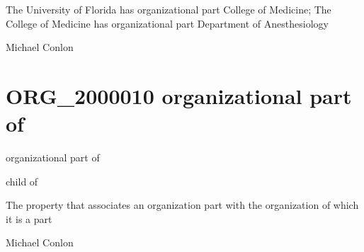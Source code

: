 \documentclass[letterpaper,10pt,english]{sphinxmanual}
\begin{document}
\begin{sphinxShadowBox}

\sphinxAtStartPar
The University of Florida has organizational part College of Medicine; The College of Medicine has organizational part Department of Anesthesiology
\end{sphinxShadowBox}

\begin{sphinxShadowBox}

\sphinxAtStartPar
Michael Conlon 
\end{sphinxShadowBox}
\begin{quote}
\label{\detokenize{doc-ORG_2000010:org-2000010}}\label{\detokenize{doc-ORG_2000010:organizational-part-of}}\label{\detokenize{doc-ORG_2000010:org-2000010}}
\ignorespaces \end{quote}


\section{ORG\_2000010 \sphinxhyphen{} organizational part of}
\label{\detokenize{doc-ORG_2000010:org-2000010-organizational-part-of}}\label{\detokenize{doc-ORG_2000010:index-0}}\label{\detokenize{doc-ORG_2000010::doc}}
\begin{sphinxShadowBox}

\sphinxAtStartPar
organizational part of
\end{sphinxShadowBox}

\begin{sphinxShadowBox}

\sphinxAtStartPar
child of
\end{sphinxShadowBox}

\begin{sphinxShadowBox}

\sphinxAtStartPar
The property that associates an organization part with the organization of which it is a part
\end{sphinxShadowBox}

\begin{sphinxShadowBox}

\sphinxAtStartPar
Michael Conlon 
\end{sphinxShadowBox}
\end{document}
